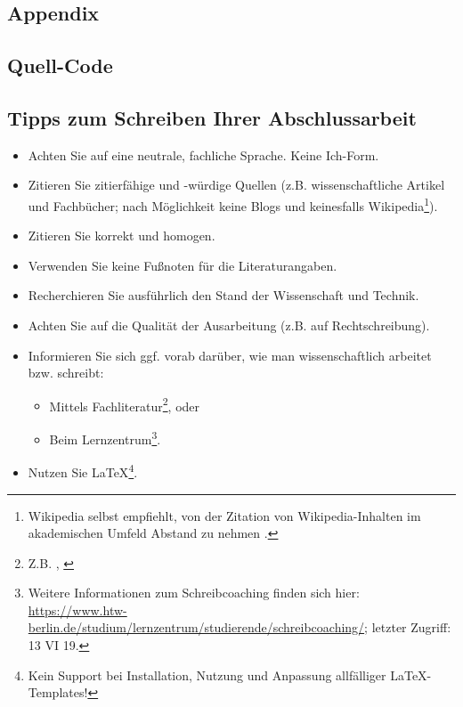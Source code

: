 \documentclass[oneside,bibliography=totocnumbered,BCOR=5mm]{scrbook}%
\theoremstyle{definition}
\theoremstyle{definition}
\theoremstyle{definition}
\theoremstyle{definition}
\theoremstyle{definition}
\theoremstyle{definition}
\begin{document}
\begin{appendix}


\chapter{Appendix}


\section{Quell-Code}

\section{Tipps zum Schreiben Ihrer Abschlussarbeit}

\begin{itemize}
\item Achten Sie auf eine neutrale, fachliche Sprache. Keine \glqq{}Ich\grqq{}-Form.
\item Zitieren Sie zitierf\"ahige und -w\"urdige Quellen (z.B. wissenschaftliche Artikel und Fachb\"ucher; nach M\"oglichkeit keine Blogs und keinesfalls Wikipedia\footnote{Wikipedia selbst empfiehlt, von der Zitation von Wikipedia-Inhalten im akademischen Umfeld Abstand zu nehmen \autocite{wikipedia2019}.}). 
\item Zitieren Sie korrekt und homogen.
\item Verwenden Sie keine Fu{\ss}noten f\"ur die Literaturangaben.
\item Recherchieren Sie ausf\"uhrlich den Stand der Wissenschaft und Technik.
\item Achten Sie auf die Qualit\"at der Ausarbeitung (z.B. auf Rechtschreibung).
\item Informieren Sie sich ggf. vorab dar\"uber, wie man wissenschaftlich arbeitet bzw. schreibt:
\begin{itemize}
\item Mittels Fachliteratur\footnote{Z.B. \autocite{balzert2011}, \autocite{franck2013}}, oder
\item Beim Lernzentrum\footnote{Weitere Informationen zum Schreibcoaching finden sich hier: \url{https://www.htw-berlin.de/studium/lernzentrum/studierende/schreibcoaching/}; letzter Zugriff: 13 VI 19.}.
\end{itemize}
\item Nutzen Sie \LaTeX\footnote{Kein Support bei Installation, Nutzung und Anpassung allf\"alliger \LaTeX-Templates!}.
\end{itemize}




\end{appendix}
\end{document}
